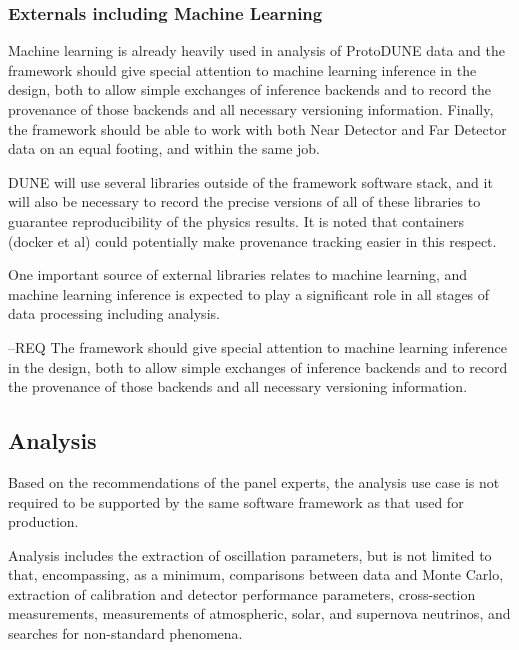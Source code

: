 \documentclass[../main-v1.tex]{subfiles}
\begin{document}
\subsubsection{Externals including Machine Learning}
Machine learning is already heavily used in analysis of ProtoDUNE data and the framework should give special attention to machine learning inference in the design, both to allow simple exchanges of inference backends and to record the provenance of those backends and all necessary versioning information.  Finally, the framework should be able to work with both Near Detector and Far Detector data on an equal footing, and within the same job.

DUNE will use several libraries outside of the framework software stack, and it will also be necessary to record the precise versions of all of these libraries to guarantee reproducibility of the physics results.  It is noted that containers (docker et al) could potentially make provenance tracking easier in this respect.  



One important source of external libraries relates to machine learning, and machine learning inference is expected to play a significant role in all stages of data processing including analysis.  

--REQ The framework should give special attention to machine learning inference in the design, both to allow simple exchanges of inference backends and to record the provenance of those backends and all necessary versioning information.






\subsection{Analysis}

Based on the recommendations of the  panel experts, the analysis use case is not required to be supported by the same software framework as that used for production.


Analysis includes the extraction of oscillation parameters, but is not limited to that, encompassing, as a minimum, comparisons between data and Monte Carlo, extraction of calibration and detector performance parameters, cross-section measurements, measurements of atmospheric, solar, and supernova neutrinos, and searches for non-standard phenomena.
\end{document}

